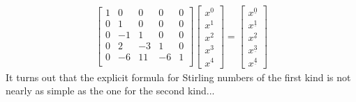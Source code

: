 \documentclass{article}
\renewcommand\({\left(}
\renewcommand\){\right)}
\begin{document}
\begin{align*}
    \begin{bmatrix}
 1 & 0 & 0 & 0 & 0 \\
 0 & 1 & 0 & 0 & 0 \\
 0 & -1 & 1 & 0 & 0 \\
 0 & 2 & -3 & 1 & 0 \\
 0 & -6 & 11 & -6 & 1 \\
    \end{bmatrix}\begin{bmatrix}x^0\\x^1\\x^2\\x^3\\x^4\end{bmatrix}
    =\begin{bmatrix}x^{\underline{0}}\\x^{\underline{1}}\\x^{\underline{2}}\\x^{\underline{3}}\\x^{\underline{4}}\end{bmatrix}
\end{align*}
It turns out that the explicit formula for Stirling numbers of the first kind is not nearly as simple as the one for the second kind...
\end{document}
